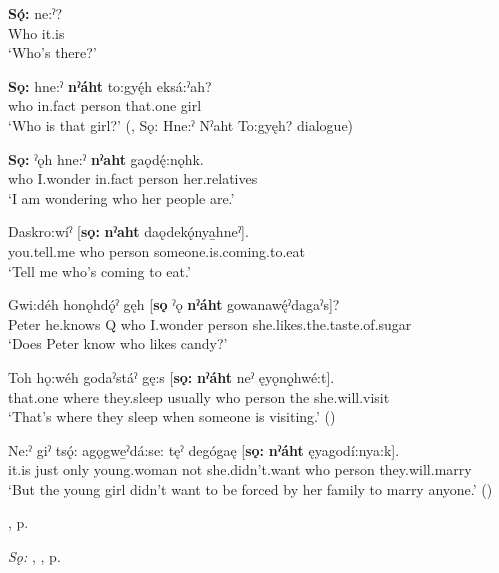 \ea
\label{ex:spart75}
\gll \textbf{Sǫ́:} ne:ˀ?\\
Who it.is\\
\glt ‘Who’s there?’
\z

\ea
\label{ex:spart76}
\gll \textbf{Sǫ:} hne:ˀ \textbf{nˀáht} to:gyę́h eksá:ˀah?\\
who in.fact person that.one girl\\
\glt ‘Who is that girl?’ (\cite[61]{mithun_watewayestanih_1984}, Sǫ: Hne:ˀ Nˀaht To:gyęh? dialogue)
\z

\ea
\label{ex:spart77}
\gll \textbf{Sǫ:} ˀǫh hne:ˀ \textbf{nˀaht} gaǫdę́:nǫhk.\\
who I.wonder in.fact person her.relatives\\
\glt ‘I am wondering who her people are.’
\z

\ea
\label{ex:spart78}
\gll Daskro:wíˀ [\textbf{sǫ:} \textbf{nˀaht} daǫdekǫ́nya̱hneˀ].\\
you.tell.me who person someone.is.coming.to.eat\\
\glt ‘Tell me who’s coming to eat.’
\z

\ea
\label{ex:spart79}
\gll Gwi:déh honǫhdǫ́ˀ gęh [\textbf{sǫ} ˀǫ \textbf{nˀáht} gowanawę́ˀdagaˀs]?\\
Peter he.knows Q who I.wonder person she.likes.the.taste.of.sugar\\
\glt ‘Does Peter know who likes candy?’
\z

\ea
\label{ex:spart80}
\gll Toh hǫ:wéh godaˀstáˀ gę:s [\textbf{sǫ:} \textbf{nˀáht} neˀ ęyǫnǫ̱hwé:t].\\
that.one where they.sleep usually who person the she.will.visit\\
\glt ‘That’s where they sleep when someone is visiting.’ (\cite{henry_de_2005})
\z

\ea
\label{ex:spart81}
\gll Ne:ˀ giˀ tsǫ́: agǫgwe̱ˀdá:se: tęˀ degógaę [\textbf{sǫ:} \textbf{nˀáht} ęyagodí:nya:k].\\
it.is just only young.woman not she.didn’t.want who person they.will.marry\\
\glt ‘But the young girl didn’t want to be forced by her family to marry anyone.’ (\cite{carrier_legends_2013})
\z

\begin{CayugaRelated}
\item {} , p. \pageref{p:[-nˀaht, -noht]}\\
\item \textit{Sǫ:} , , p. \pageref{p:[sǫ:]}
\end{CayugaRelated}


